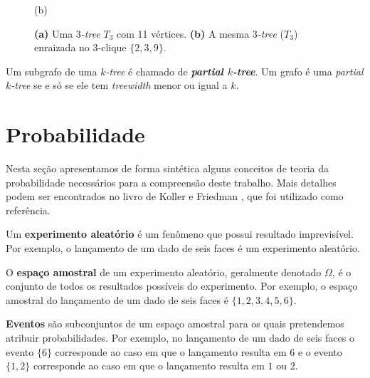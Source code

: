 \begin{definition}
\begin{figure}
\begin{minipage}{0.5\textwidth}

      (b)
    \end{minipage}

    \caption{
      \textbf{(a)} Uma \emph{$3$-tree} $T_3$ com 11 vértices.
      \textbf{(b)} A mesma \emph{$3$-tree} ($T_3$) enraizada no $3$-clique $\{2, 3, 9\}$.
    }
    \label{fig:rootedktree}
  \end{figure}
\end{definition}

\begin{definition}
  \cite{bodlaender} Um subgrafo de uma \emph{$k$-tree} é chamado de \textbf{\emph{partial $k$-tree}}. Um grafo é uma \emph{partial $k$-tree} se e só se ele tem \emph{treewidth} menor ou igual a $k$.
\end{definition}

\section{Probabilidade}

Nesta seção apresentamos de forma sintética alguns conceitos de teoria da probabilidade necessários para a compreensão deste trabalho. Mais detalhes podem ser encontrados no livro de Koller e Friedman \cite{koller}, que foi utilizado como referência.

Um \textbf{experimento aleatório} é um fenômeno que possui resultado imprevisível. Por exemplo, o lançamento de um dado de seis faces é um experimento aleatório.

O \textbf{espaço amostral} de um experimento aleatório, geralmente denotado $\Omega$, é o conjunto de todos os resultados possíveis do experimento. Por exemplo, o espaço amostral do lançamento de um dado de seis faces é $\{1, 2, 3, 4, 5, 6\}$.

\textbf{Eventos} são subconjuntos de um espaço amostral para os quais pretendemos atribuir probabilidades. Por exemplo, no lançamento de um dado de seis faces o evento $\{6\}$ corresponde ao caso em que o lançamento resulta em $6$ e o evento $\{1, 2\}$ corresponde ao caso em que o lançamento resulta em $1$ ou $2$.

